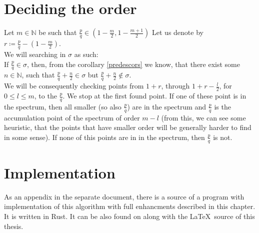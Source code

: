 \section{Deciding the order}
Let $m \in \mathbb{N}$ be such that $\frac{p}{q} \in (1-\frac{m}{2},1-
\frac{m+1}{2})$
Let us denote by $r \coloneqq \frac{p}{q} - (1-\frac{m}{2})$. \\ 

We will searching in $\sigma$ as such: \\

If $\frac{p}{q} \in \sigma$, then, from the corollary \ref{predescors} we know, that there 
exist some $n \in \mathbb{N}$, such that $\frac{p}{q} + \frac{n}{2} \in \sigma$ but 
$\frac{p}{q} + \frac{n}{2} \not\in \sigma$. \\

We will be consequently checking points from $1+r$, through $1+r-\frac{l}{2}$, for 
$0 \leq l \leq m$, to the $\frac{p}{q}$. We stop at the first found point. 
If one of these point is in the spectrum, then all smaller (so also $\frac{p}{q}$) are in 
the spectrum and $\frac{p}{q}$ is the accumulation point of the spectrum of order $m-l$ 
(from this, 
 we can see some heuristic, that the points that have smaller order will be generally 
harder to find in some sense). If none of this points are in in the spectrum, then $\frac{p}{q}$ 
is not. \\




\section{Implementation}
As an appendix in the separate document, there is a source of a program with implementation 
of this algorithm 
with full  
enhancments described in this chapter. It is written in Rust. 
It can be also found on  along with the \LaTeX\ source of 
this thesis.



